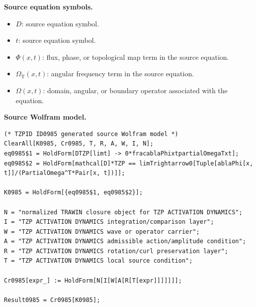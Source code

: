 \begin{minipage}[t]{0.49\linewidth}
\begingroup
\small
\raggedright
\textbf{Source equation symbols.}\par
\begin{itemize}[leftmargin=1.35em,itemsep=1pt,topsep=1pt,parsep=0pt]
    \item $D$: source equation symbol.
    \item $t$: source equation symbol.
    \item $\Phi(x,t)$: flux, phase, or topological map term in the source equation.
    \item $\Omega_{\mathrm{T}}(x,t)$: angular frequency term in the source equation.
    \item $\Omega(x,t)$: domain, angular, or boundary operator associated with the equation.
\end{itemize}
\endgroup
\end{minipage}\hfill
\begin{minipage}[t]{0.47\linewidth}
\begingroup
\scriptsize
\raggedright
\textbf{Source Wolfram model.}\par
\begin{Verbatim}[fontsize=\tiny,breaklines=true,breakanywhere=true]
(* TZPID ID0985 generated source Wolfram model *)
ClearAll[K0985, Cr0985, T, R, A, W, I, N];
eq0985$1 = HoldForm[DTZP[limt] -> 0*fracablaPhixtpartialOmegaTxt];
eq0985$2 = HoldForm[mathcal[D]*TZP == limTrightarrow0[Tuple[ablaPhi[x, t]]/(PartialOmega^T*Pair[x, t])]];

K0985 = HoldForm[{eq0985$1, eq0985$2}];

N = "normalized TRAWIN closure object for TZP ACTIVATION DYNAMICS";
I = "TZP ACTIVATION DYNAMICS integration/comparison layer";
W = "TZP ACTIVATION DYNAMICS wave or operator carrier";
A = "TZP ACTIVATION DYNAMICS admissible action/amplitude condition";
R = "TZP ACTIVATION DYNAMICS rotation/curl preservation layer";
T = "TZP ACTIVATION DYNAMICS local source condition";

Cr0985[expr_] := HoldForm[N[I[W[A[R[T[expr]]]]]]];

Result0985 = Cr0985[K0985];
\end{Verbatim}
\endgroup
\end{minipage}

